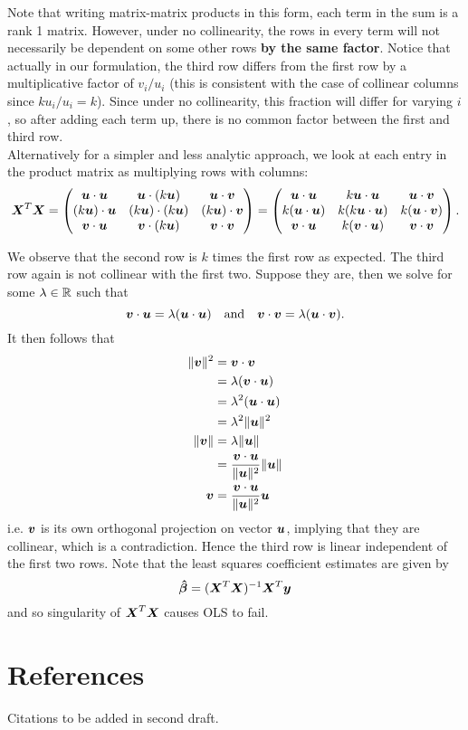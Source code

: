 \documentclass[12pt]{article}
\newcommand{\gbh}{\hat{\gb}}
\begin{document}
	Note that writing matrix-matrix products in this form, each term in the sum is a rank 1 matrix. However, under no collinearity, the rows in every term will not necessarily be dependent on some other rows \textbf{by the same factor}. Notice that actually in our formulation, the third row differs from the first row by a multiplicative factor of $v_i/u_i$ (this is consistent with the case of collinear columns since $ku_i/u_i=k$). Since under no collinearity, this fraction will differ for varying $i$, so after adding each term up, there is no common factor between the first and third row.\\
	
	Alternatively for a simpler and less analytic approach, we look at each entry in the product matrix as multiplying rows with columns:
	$$\boldsymbol{X}^T\boldsymbol{X}=\begin{pmatrix}
		\boldsymbol{u}\cdot\boldsymbol{u} & \boldsymbol{u}\cdot(k\boldsymbol{u}) & \boldsymbol{u}\cdot\boldsymbol{v}\\
		(k\boldsymbol{u})\cdot\boldsymbol{u} & (k\boldsymbol{u})\cdot(k\boldsymbol{u}) & (k\boldsymbol{u})\cdot\boldsymbol{v} \\
		\boldsymbol{v}\cdot\boldsymbol{u} & \boldsymbol{v}\cdot(k\boldsymbol{u}) & \boldsymbol{v}\cdot\boldsymbol{v}
	\end{pmatrix}=\begin{pmatrix}
		\boldsymbol{u}\cdot\boldsymbol{u} & k\boldsymbol{u}\cdot\boldsymbol{u} & \boldsymbol{u}\cdot\boldsymbol{v}\\
		k(\boldsymbol{u}\cdot\boldsymbol{u}) & k(k\boldsymbol{u}\cdot\boldsymbol{u}) & k(\boldsymbol{u}\cdot\boldsymbol{v}) \\
		\boldsymbol{v}\cdot\boldsymbol{u} & k(\boldsymbol{v}\cdot\boldsymbol{u}) & \boldsymbol{v}\cdot\boldsymbol{v}
	\end{pmatrix}.$$
	
	We observe that the second row is $k$ times the first row as expected. The third row again is not collinear with the first two. Suppose they are, then we solve for some $\lm\in\RR$ such that
	$$\boldsymbol{v}\cdot\boldsymbol{u}=\lambda(\boldsymbol{u}\cdot\boldsymbol{u}) \quad \text{and}\quad \boldsymbol{v}\cdot\boldsymbol{v}=\lambda(\boldsymbol{u}\cdot\boldsymbol{v}).$$
	It then follows that
	\begin{align*}
		\|\boldsymbol{v}\|^2&=\boldsymbol{v}\cdot\boldsymbol{v}\\
		&=\lambda(\boldsymbol{v}\cdot\boldsymbol{u})\\
		&=\lambda^2(\boldsymbol{u}\cdot\boldsymbol{u})\\
		&=\lambda^2\|\boldsymbol{u}\|^2\\ 
		\|\boldsymbol{v}\|&=\lambda\|\boldsymbol{u}\|\\
		&=\dfrac{\boldsymbol{v}\cdot\boldsymbol{u}}{\|\boldsymbol{u}\|^2}\|\boldsymbol{u}\|\\
		\boldsymbol{v}&=\dfrac{\boldsymbol{v}\cdot\boldsymbol{u}}{\|\boldsymbol{u}\|^2}\boldsymbol{u}
	\end{align*}
	$$$$
	i.e. $\boldsymbol{v}$ is its own orthogonal projection on vector $\boldsymbol{u}$, implying that they are collinear, which is a contradiction. Hence the third row is linear independent of the first two rows. Note that the least squares coefficient estimates are given by
	$$\boldsymbol{\gbh}=(\bmX^T\bmX)^{-1}\bmX^T\bmy$$
	and so singularity of $\boldsymbol{X}^T\boldsymbol{X}$ causes OLS to fail.\\
	
	\section{References}
	Citations to be added in second draft.
	
\end{document}
